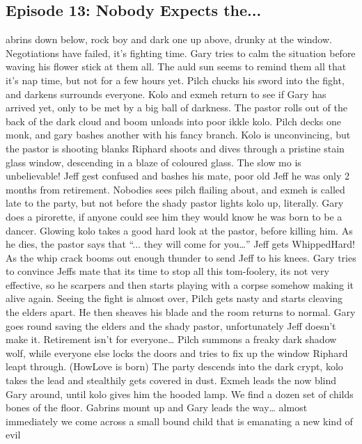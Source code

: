 \subsection{Episode 13: Nobody Expects the...}
abrins down below, rock boy and dark one up above, drunky at the window.\medskip
Negotiations have failed, it’s fighting time.\medskip
Gary tries to calm the situation before waving his flower stick at them all. The auld sun seems to remind them all that it’s nap time, but not for a few hours yet.\medskip
Pilch chucks his sword into the fight, and darkens surrounds everyone.\medskip
Kolo and exmeh return to see if Gary has arrived yet, only to be met by a big ball of darkness.\medskip
The pastor rolls out of the back of the dark cloud and boom unloads into poor ikkle kolo.\medskip
Pilch decks one monk, and gary bashes another with his fancy branch.\medskip
Kolo is unconvincing, but the pastor is shooting blanks\medskip
Riphard shoots and dives through a pristine stain glass window, descending in a blaze of coloured glass. The slow mo is unbelievable!\medskip
Jeff gest confused and bashes his mate, poor old Jeff he was only 2 months from retirement.\medskip
Nobodies sees pilch flailing about, and exmeh is called late to the party, but not before the shady pastor lights kolo up, literally.\medskip
Gary does a pirorette, if anyone could see him they would know he was born to be a dancer.\medskip
Glowing kolo takes a good hard look at the pastor, before killing him. As he dies, the pastor says that “... they will come for you…”\medskip
Jeff gets WhippedHard! As the whip crack booms out enough thunder to send Jeff to his knees.\medskip
Gary tries to convince Jeffs mate that its time to stop all this tom-foolery, its not very effective, so he scarpers and then starts playing with a corpse somehow making it alive again.\medskip
Seeing the fight is almost over, Pilch gets nasty and starts cleaving the elders apart. He then sheaves his blade and the room returns to normal.\medskip
Gary goes round saving the elders and the shady pastor, unfortunately Jeff doesn’t make it. Retirement isn’t for everyone…\medskip
Pilch summons a freaky dark shadow wolf, while everyone else locks the doors and tries to fix up the window Riphard leapt through. (HowLove is born)\medskip
The party descends into the dark crypt, kolo takes the lead and stealthily gets covered in dust. Exmeh leads the now blind Gary around, until kolo gives him the hooded lamp.\medskip
We find a dozen set of childs bones of the floor.\medskip
Gabrins mount up and Gary leads the way… almost immediately we come across a small bound child that is emanating a new kind of evil\medskip
